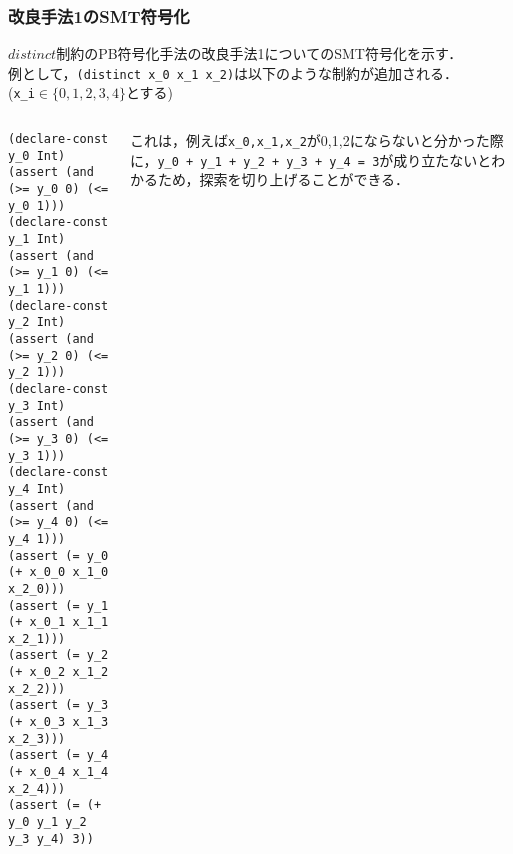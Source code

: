 \documentclass [dvipdfmx,11pt]{beamer}
\newcommand{\distinct}{$distinct$}
\begin{document}
\begin{frame}[fragile]\footnotesize
    \frametitle{改良手法1のSMT符号化}
    \distinct 制約のPB符号化手法の改良手法1についてのSMT符号化を示す．\\
    例として，\verb|(distinct x_0 x_1 x_2)|は以下のような制約が追加される．\\
    (\verb|x_i|$\in \{0,1,2,3,4\}$とする)

    \begin{columns}
        \begin{column}{0.5\textwidth}
            \begin{exampleblock}{}\scriptsize
\begin{verbatim}
(declare-const y_0 Int)
(assert (and (>= y_0 0) (<= y_0 1)))
(declare-const y_1 Int)
(assert (and (>= y_1 0) (<= y_1 1)))
(declare-const y_2 Int)
(assert (and (>= y_2 0) (<= y_2 1)))
(declare-const y_3 Int)
(assert (and (>= y_3 0) (<= y_3 1)))
(declare-const y_4 Int)
(assert (and (>= y_4 0) (<= y_4 1)))
(assert (= y_0 (+ x_0_0 x_1_0 x_2_0)))
(assert (= y_1 (+ x_0_1 x_1_1 x_2_1)))
(assert (= y_2 (+ x_0_2 x_1_2 x_2_2)))
(assert (= y_3 (+ x_0_3 x_1_3 x_2_3)))
(assert (= y_4 (+ x_0_4 x_1_4 x_2_4)))
(assert (= (+ y_0 y_1 y_2 y_3 y_4) 3))
\end{verbatim}
            \end{exampleblock}
        \end{column}
        \begin{column}{0.5\textwidth}\scriptsize
            これは，例えば\verb|x_0,x_1,x_2|が0,1,2にならないと分かった際に，\verb|y_0 + y_1 + y_2 + y_3 + y_4 = 3|が成り立たないとわかるため，探索を切り上げることができる．
        \end{column}
    \end{columns}
\end{frame}
\end{document}
